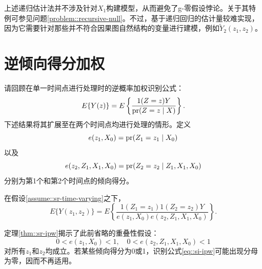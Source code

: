 上述递归估计法并不涉及针对$X_1$构建模型，从而避免了g-零假设悖论。关于其特例可参见问题\ref{problem::recursive-null}。不过，基于递归回归的估计量较难实现，因为它需要针对那些并不符合因果图自然结构的变量进行建模，例如$\tilde{Y}_2(z_1, z_2)$。 




\section{逆倾向得分加权}\label{section::si-ipw}


请回顾在单一时间点进行处理时的逆概率加权识别公式：
$$
E\{  Y(z) \} = E  \left\{   \frac{ 1(Z=z) Y  }{  \textup{pr}(Z=z\mid X) }  \right\}.
$$
下述结果将其扩展至在两个时间点均进行处理的情形。定义$$
e(z_1, X_0) = \textup{pr}(Z_1=z_1\mid X_0) 
$$以及$$
e(z_2, Z_1, X_1, X_0) =  \textup{pr}(Z_2 = z_2 \mid Z_1, X_1,  X_0)
$$分别为第1个和第2个时间点的倾向得分。 

\begin{theorem}
\label{thm::sr-ipw}
在假设\ref{assume::sr-time-varying}之下，
\begin{equation}
E\{ Y(z_1, z_2) \} 
= E\left\{    \frac{  1(Z_1=z_1) 1(Z_2=z_2) Y  }{   e(z_1, X_0)  e(z_2,Z_1, X_1,  X_0)     }   \right\} .
\label{eq::si-ipw}
\end{equation}
\end{theorem}


定理\ref{thm::sr-ipw}揭示了此前省略的重叠性假设：$$
0< e(z_1, X_0)   <1,\quad
0< e(z_2, Z_1, X_1,  X_0)   < 1
$$对所有$z_1$和$z_2$均成立。若某些倾向得分为0或1，识别公式\eqref{eq::si-ipw}可能出现分母为零，因而不再适用。 



